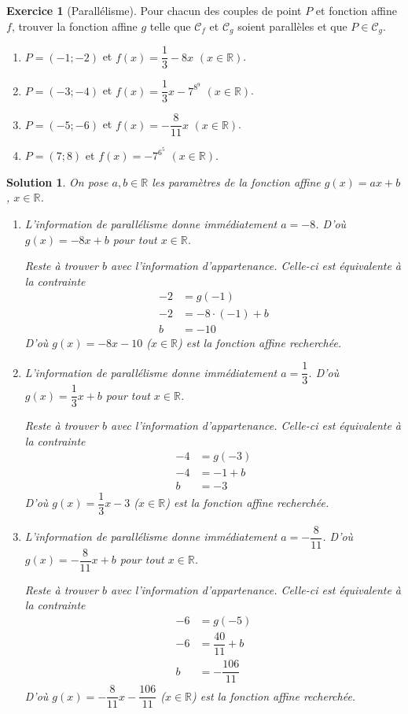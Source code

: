 \documentclass[12pt]{paper}
\theoremstyle{plain}
\newtheorem*{sol}{Solution}
\theoremstyle{definition}
\newtheorem{ex}{Exercice}
\newcommand{\C}{\mathcal{C}}
\newcommand{\R}{\mathbb{R}}
\newcommand{\exe}[2]{
		\begin{ex} #1  \end{ex}
		\begin{sol} #2 \end{sol}
	}
\newcommand{\exe}[2]{
		\begin{ex} #1  \end{ex}
	}
\begin{document}
\exe{[Parallélisme]
	Pour chacun des couples de point $P$ et fonction affine $f$, trouver la fonction affine $g$ telle que $\C_f$ et $\C_g$ soient parallèles et que $P \in \C_g$.
	
	
	\begin{multicols}{2}
	\begin{enumerate}
		\item $P=(-1;-2)$ et $f(x) = \dfrac13 - 8x$ $(x\in\R)$.
		\item $P=(-3;-4)$ et $f(x) = \dfrac13 x - 7^{8^9}$ $(x\in\R)$.
		\item $P=(-5;-6)$ et $f(x) = -\dfrac{8}{11}x$ $(x\in\R)$.
		\item $P=(7;8)$ et $f(x) = -7^{6^{5}}$ $(x\in\R)$.
	\end{enumerate}
	\end{multicols}
}{
	On pose $a,b\in\R$ les paramètres de la fonction affine $g(x)=ax+b$, $x\in\R$.
	\begin{enumerate}
		\item 
			L'information de parallélisme donne immédiatement $a=-8$.
			D'où $g(x) = -8x+b$ pour tout $x\in\R$.
			
			Reste à trouver $b$ avec l'information d'appartenance.
			Celle-ci est équivalente à la contrainte
				\begin{align*}
					-2 &= g(-1) \\
					-2 &= -8\cdot(-1) + b \\
					b &= -10
				\end{align*}
			D'où $g(x) = -8x -10$ ($x\in\R$) est la fonction affine recherchée.
		
		
		\item 
			L'information de parallélisme donne immédiatement $a=\dfrac13$.
			D'où $g(x) = \dfrac13x+b$ pour tout $x\in\R$.
			
			Reste à trouver $b$ avec l'information d'appartenance.
			Celle-ci est équivalente à la contrainte
				\begin{align*}
					-4 &= g(-3) \\
					-4 &= -1 + b \\
					b &= -3
				\end{align*}
			D'où $g(x) = \dfrac13x-3$ ($x\in\R$) est la fonction affine recherchée.
			
		\item 
			L'information de parallélisme donne immédiatement $a=-\dfrac8{11}$.
			D'où $g(x)=-\dfrac8{11}x + b$ pour tout $x\in\R$.
			
			Reste à trouver $b$ avec l'information d'appartenance.
			Celle-ci est équivalente à la contrainte
				\begin{align*}
					-6 &= g(-5) \\
					-6 &=  \dfrac{40}{11} + b \\
					b &= -\dfrac{106}{11}
				\end{align*}
			D'où $g(x) = -\dfrac8{11}x -\dfrac{106}{11}$ ($x\in\R$) est la fonction affine recherchée.
			

\end{enumerate}}
\end{document}
